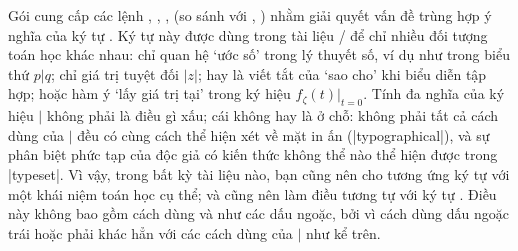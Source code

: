 \documentclass[11pt,leqno,titlepage,openany]{amsldoc}[1999/12/13]
\begin{document}
Gói  cung cấp các lệnh , ,
,  (so sánh với , ) nhằm
giải quyết vấn đề trùng hợp ý nghĩa của ký tự \qc{\|}.
Ký tự này được dùng trong tài liệu \latex/ để chỉ nhiều đối tượng
toán học khác nhau: chỉ quan hệ `ước số' trong lý thuyết số, ví dụ như
trong biểu thứ $p\vert q$; chỉ giá trị tuyệt đối $\lvert z\rvert$; hay
là viết tắt của `sao cho' khi biểu diễn tập hợp; hoặc hàm ý `lấy giá trị tại'
trong ký hiệu $f_\zeta(t)\bigr\rvert_{t=0}$.
Tính đa nghĩa của ký hiệu $\vert$ không phải là điều gì xấu; cái không
hay là ở chỗ: không phải tất cả cách dùng của $\vert$ đều có cùng cách thể hiện
xét về mặt in ấn (|typographical|), và sự phân biệt phức tạp của độc giả
có kiến thức không thể nào thể hiện được trong |typeset|.
Vì vậy, trong bất kỳ tài liệu nào, bạn cũng nên cho tương ứng ký tự \qc{\|}
với một khái niệm toán học cụ thể; và cũng nên làm điều tương tự với ký tự
\cn{\|}.
Điều này không bao gồm cách dùng \qc{|} và \ncn{\|}
như các dấu ngoặc, bởi vì cách dùng dấu ngoặc trái hoặc phải khác hẳn với
các cách dùng của $\vert$ như kể trên.
\end{document}
